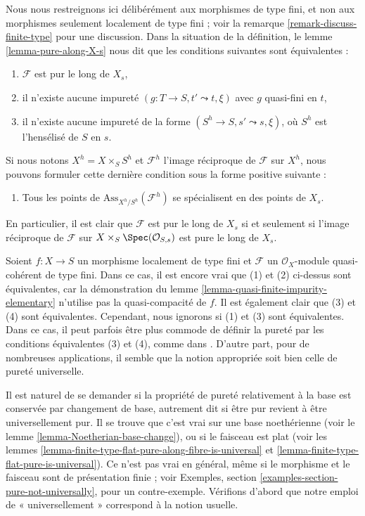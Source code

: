 \noindent
Nous nous restreignons ici délibérément aux morphismes
de type fini, et non aux morphismes seulement localement de
type fini ; voir la
remarque \ref{remark-discuss-finite-type}
pour une discussion. Dans la situation de la définition, le
lemme \ref{lemma-pure-along-X-s}
nous dit que les conditions suivantes sont équivalentes :
\begin{enumerate}
\item $\mathcal{F}$ est pur le long de $X_s$,
\item il n'existe aucune impureté $(g : T \to S, t' \leadsto t, \xi)$ avec $g$
quasi-fini en $t$,
\item il n'existe aucune impureté de la forme
$(S^h \to S, s' \leadsto s, \xi)$, où $S^h$ est l'hensélisé
de $S$ en $s$.
\end{enumerate}
Si nous notons $X^h = X \times_S S^h$ et $\mathcal{F}^h$ l'image réciproque
de $\mathcal{F}$ sur $X^h$, nous pouvons formuler cette dernière condition
sous la forme positive suivante :
\begin{enumerate}
\item[(4)] Tous les points de $\text{Ass}_{X^h/S^h}(\mathcal{F}^h)$ se spécialisent
en des points de $X_s$.
\end{enumerate}
En particulier, il est clair que $\mathcal{F}$ est pur le long de $X_s$
si et seulement si l'image réciproque de $\mathcal{F}$ sur
$X \times_S \Spec(\mathcal{O}_{S, s})$ est pure le long de $X_s$.

\begin{remark}
\label{remark-discuss-finite-type}
Soient $f : X \to S$ un morphisme localement de type fini
et $\mathcal{F}$ un $\mathcal{O}_X$-module quasi-cohérent de type fini.
Dans ce cas, il est encore vrai que (1) et (2) ci-dessus sont équivalentes,
car la démonstration du
lemme \ref{lemma-quasi-finite-impurity-elementary}
n'utilise pas la quasi-compacité de $f$. Il est également clair que
(3) et (4) sont équivalentes. Cependant, nous ignorons si (1) et (3) sont
équivalentes. Dans ce cas, il peut parfois être plus commode de définir
la pureté par les conditions équivalentes (3) et (4), comme dans \cite{GruRay}.
D'autre part, pour de nombreuses applications, il semble que la notion appropriée
soit bien celle de pureté universelle.
\end{remark}

\noindent
Il est naturel de se demander si la propriété de pureté relativement à
la base est conservée par changement de base, autrement dit si être pur revient
à être universellement pur. Il se trouve que c'est vrai
sur une base noethérienne (voir le
lemme \ref{lemma-Noetherian-base-change}),
ou si le faisceau est plat (voir les
lemmes \ref{lemma-finite-type-flat-pure-along-fibre-is-universal} et
\ref{lemma-finite-type-flat-pure-is-universal}).
Ce n'est pas vrai en général, même si le morphisme et le faisceau sont de
présentation finie ; voir
Exemples, section \ref{examples-section-pure-not-universally},
pour un contre-exemple. Vérifions d'abord que notre emploi de « universellement »
correspond à la notion usuelle.

